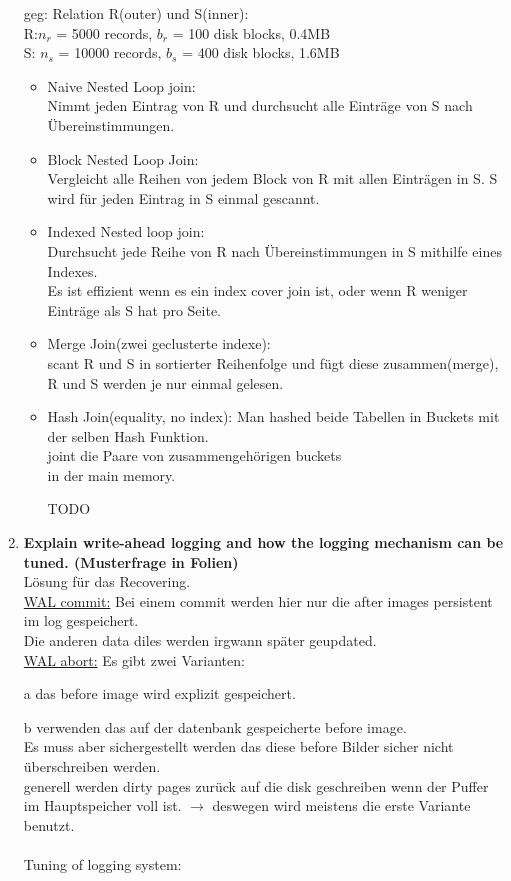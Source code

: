 \documentclass[12pt]{article}\pagestyle{myheadings}
\theoremstyle{plain}
\begin{document}
\begin{enumerate}
geg: Relation R(outer) und S(inner):\\
R:$ n_{r}$ = 5000 records, $b_{r}$ = 100 disk blocks, 0.4MB\\
S: $n_{s}$ = 10000 records, $b_{s}$ = 400 disk blocks, 1.6MB
\begin{itemize}
\item Naive Nested Loop join:\\
Nimmt jeden Eintrag von R und durchsucht alle Einträge von S nach Übereinstimmungen.
\item Block Nested Loop Join:\\
Vergleicht alle Reihen von jedem Block von R mit allen Einträgen in S.
S wird für jeden Eintrag in S einmal gescannt.
\item Indexed Nested loop join: \\Durchsucht jede  Reihe von R nach Übereinstimmungen in S mithilfe eines Indexes.\\
Es ist effizient wenn es ein index cover join ist, oder wenn R weniger Einträge als S hat pro Seite.
\item Merge Join(zwei geclusterte indexe):\\
scant R und S in sortierter Reihenfolge und fügt diese zusammen(merge), R und S werden je nur einmal gelesen.
\item Hash Join(equality, no index):
Man hashed beide Tabellen in Buckets mit der selben Hash Funktion.\\
joint die Paare von zusammengehörigen buckets\\ in der main memory.

TODO 

\end{itemize}
\item \textbf{Explain write-ahead logging and how the logging mechanism can be tuned. (Musterfrage in Folien)} \\
Lösung für das Recovering.\\
\underline{WAL commit:} 
Bei einem commit werden hier nur die after images persistent im log gespeichert.\\
Die anderen data diles werden irgwann später geupdated.\\
\underline{WAL abort:}
Es gibt zwei Varianten:
\item[a] das before image wird explizit gespeichert. 
\item[b] verwenden das auf der datenbank gespeicherte before image.\\
Es muss aber sichergestellt werden das diese before Bilder sicher nicht überschreiben werden.\\generell werden dirty pages zurück auf die disk geschreiben wenn der Puffer im Hauptspeicher voll ist. $\rightarrow$ deswegen wird meistens die erste Variante benutzt.\\ \\
Tuning of logging system:
\begin{itemize}


\end{itemize}
\end{enumerate}
\end{document}
